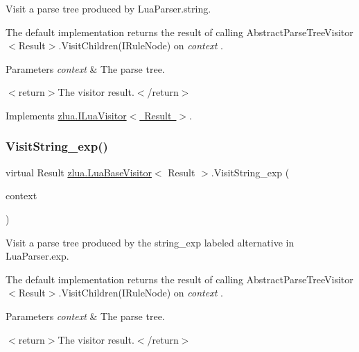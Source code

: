 Visit a parse tree produced by Lua\+Parser.\+string. 

The default implementation returns the result of calling Abstract\+Parse\+Tree\+Visitor$<$\+Result$>$.\+Visit\+Children(\+I\+Rule\+Node) on {\itshape context} . 


\begin{DoxyParams}{Parameters}
{\em context} & The parse tree.\\
\hline
\end{DoxyParams}
$<$return$>$The visitor result.$<$/return$>$ 

Implements \mbox{\hyperlink{interfacezlua_1_1_i_lua_visitor_a7a2526a8d4201c1a018bf3b1e11a06c1}{zlua.\+I\+Lua\+Visitor$<$ Result $>$}}.

\mbox{\label{classzlua_1_1_lua_base_visitor_a7a571a797280a12b079c84c9c2438f5f}} 
\subsubsection{\texorpdfstring{Visit\+String\+\_\+exp()}{VisitString\_exp()}}
{\footnotesize\ttfamily virtual Result \mbox{\hyperlink{classzlua_1_1_lua_base_visitor}{zlua.\+Lua\+Base\+Visitor}}$<$ Result $>$.Visit\+String\+\_\+exp (\begin{DoxyParamCaption}\item[{\mbox{[}\+Not\+Null\mbox{]} \mbox{\hyperlink{classzlua_1_1_lua_parser_1_1_string__exp_context}{Lua\+Parser.\+String\+\_\+exp\+Context}}}]{context }\end{DoxyParamCaption})\hspace{0.3cm}{\ttfamily [virtual]}}



Visit a parse tree produced by the {\ttfamily string\+\_\+exp} labeled alternative in Lua\+Parser.\+exp. 

The default implementation returns the result of calling Abstract\+Parse\+Tree\+Visitor$<$\+Result$>$.\+Visit\+Children(\+I\+Rule\+Node) on {\itshape context} . 


\begin{DoxyParams}{Parameters}
{\em context} & The parse tree.\\
\hline
\end{DoxyParams}
$<$return$>$The visitor result.$<$/return$>$ 

